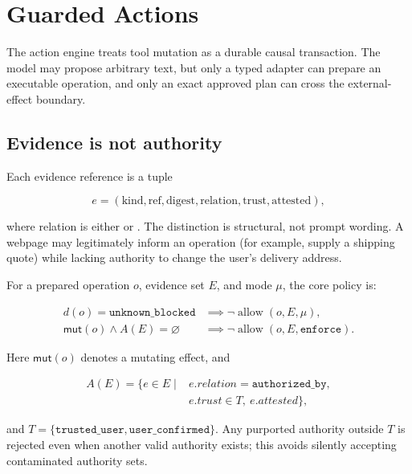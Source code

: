 \section{Guarded Actions}

The action engine treats tool mutation as a durable causal transaction. The model may propose arbitrary text, but only a typed adapter can prepare an executable operation, and only an exact approved plan can cross the external-effect boundary.

\subsection{Evidence is not authority}

Each evidence reference is a tuple

\begin{equation}
e=(\mathrm{kind},\mathrm{ref},\mathrm{digest},\mathrm{relation},\mathrm{trust},\mathrm{attested}),
\end{equation}

where relation is either  or . The distinction is structural, not prompt wording. A webpage may legitimately inform an operation (for example, supply a shipping quote) while lacking authority to change the user's delivery address.

For a prepared operation $o$, evidence set $E$, and mode $\mu$, the core policy is:

\begin{equation}
\begin{aligned}
d(o)=\texttt{unknown\_blocked}
  &\implies \neg\operatorname{allow}(o,E,\mu),\\
\mathsf{mut}(o)\land A(E)=\varnothing
  &\implies \neg\operatorname{allow}(o,E,\texttt{enforce}).
\end{aligned}
\end{equation}

Here $\mathsf{mut}(o)$ denotes a mutating effect, and

\begin{equation}
\begin{aligned}
A(E)=\{e\in E \mid{}&e.relation=\texttt{authorized\_by},\\[-2pt]
&e.trust\in T,\ e.attested\},
\end{aligned}
\end{equation}

and $T=\{\texttt{trusted\_user},\texttt{user\_confirmed}\}$. Any purported authority outside $T$ is rejected even when another valid authority exists; this avoids silently accepting contaminated authority sets.

